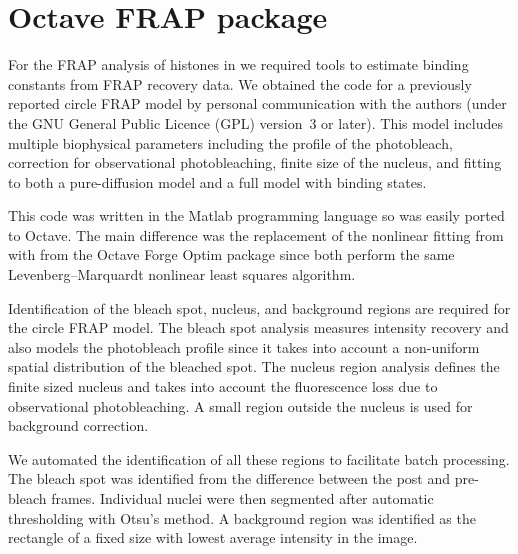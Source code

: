 \section{Octave FRAP package}
\label{sec:software:octave-frap}

For the FRAP analysis of histones
in  we required tools to estimate
binding constants from FRAP recovery data.  We obtained the code for a
previously reported circle FRAP model \citep{mcnally-frap-code} by
personal communication with the authors (under the GNU General Public
Licence (GPL) version~3 or later).  This model includes multiple
biophysical parameters including the profile of the photobleach, correction
for observational photobleaching, finite size of the nucleus, and
fitting to both a pure-diffusion model and a full model with binding
states.

This code was written in the Matlab programming language so was
easily ported to Octave.  The main difference was the replacement of
the nonlinear fitting from  with 
from the Octave Forge Optim package since both perform the same
Levenberg--Marquardt nonlinear least squares algorithm.

Identification of the bleach spot, nucleus, and background regions are
required for the circle FRAP model.  The bleach spot analysis measures
intensity recovery and also models the photobleach profile since it
takes into account a non-uniform spatial distribution of the bleached
spot.  The nucleus region analysis defines the finite sized nucleus and takes
into account the fluorescence loss due to observational
photobleaching.  A small region outside the nucleus is used for
background correction.

We automated the identification of all these regions to facilitate
batch processing.  The bleach spot was
identified from the difference between the post and pre-bleach frames.
Individual nuclei were then segmented after automatic thresholding with Otsu's
method.  A background region was identified as the rectangle of a
fixed size with lowest average intensity in the image.

